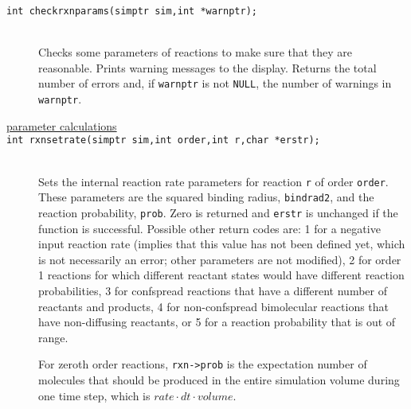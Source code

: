\documentclass {book}
\begin{document}
\begin{description}
\item[\texttt{int checkrxnparams(simptr sim,int *warnptr);}]
\hfill \\
Checks some parameters of reactions to make sure that they are reasonable. Prints warning messages to the display. Returns the total number of errors and, if \texttt{warnptr} is not \texttt{NULL}, the number of warnings in \texttt{warnptr}.

\item[\underline{parameter calculations}]

\item[\texttt{int rxnsetrate(simptr sim,int order,int r,char *erstr);}]
\hfill \\
Sets the internal reaction rate parameters for reaction \texttt{r} of order \texttt{order}. These parameters are the squared binding radius, \texttt{bindrad2}, and the reaction probability, \texttt{prob}. Zero is returned and \texttt{erstr} is unchanged if the function is successful. Possible other return codes are: 1 for a negative input reaction rate (implies that this value has not been defined yet, which is not necessarily an error; other parameters are not modified), 2 for order 1 reactions for which different reactant states would have different reaction probabilities, 3 for confspread reactions that have a different number of reactants and products, 4 for non-confspread bimolecular reactions that have non-diffusing reactants, or 5 for a reaction probability that is out of range.

For zeroth order reactions, \texttt{rxn->prob} is the expectation number of molecules that should be produced in the entire simulation volume during one time step, which is $rate \cdot dt \cdot volume$.


\end{description}
\end{document}

